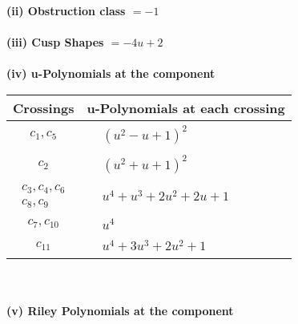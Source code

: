 \documentclass[1p]{elsarticle_modified}
\theoremstyle{definition}
\begin{document}
\flushleft \textbf{(ii) Obstruction class $= -1$}\\~\\
\flushleft \textbf{(iii) Cusp Shapes $= -4 u+2$}\\~\\
\newpage\renewcommand{\arraystretch}{1}
\flushleft \textbf{(iv) u-Polynomials at the component}\newline \\
\begin{tabular}{m{50pt}|m{274pt}}
Crossings & \hspace{64pt}u-Polynomials at each crossing \\
\hline $$\begin{aligned}c_{1},c_{5}\end{aligned}$$&$\begin{aligned}
&(u^2- u+1)^2
\end{aligned}$\\
\hline $$\begin{aligned}c_{2}\end{aligned}$$&$\begin{aligned}
&(u^2+u+1)^2
\end{aligned}$\\
\hline $$\begin{aligned}c_{3},c_{4},c_{6}\\c_{8},c_{9}\end{aligned}$$&$\begin{aligned}
&u^4+u^3+2 u^2+2 u+1
\end{aligned}$\\
\hline $$\begin{aligned}c_{7},c_{10}\end{aligned}$$&$\begin{aligned}
&u^4
\end{aligned}$\\
\hline $$\begin{aligned}c_{11}\end{aligned}$$&$\begin{aligned}
&u^4+3 u^3+2 u^2+1
\end{aligned}$\\
\hline
\end{tabular}\\~\\
\newpage\renewcommand{\arraystretch}{1}
\flushleft \textbf{(v) Riley Polynomials at the component}\newline \\
\end{document}
